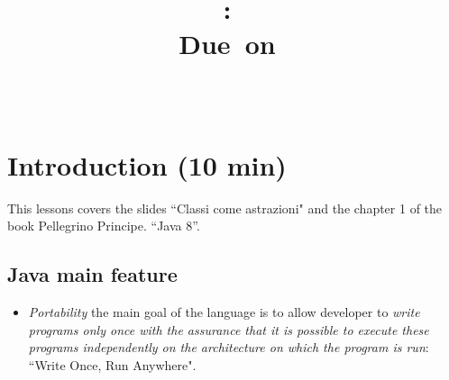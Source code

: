 \documentclass{article}
\title{
\vspace{2in}
\textmd{\textbf{\hmwkClass:\ \hmwkTitle}}\\
\normalsize\vspace{0.1in}\small{Due\ on\ \hmwkDueDate}\\
\vspace{0.1in}\large{\textit{\hmwkClassInstructor\ \hmwkClassTime}}
\vspace{3in}
}
\author{\textbf{\hmwkAuthorName}}
\date{} %
\theoremstyle{definition}
\begin{document}
\maketitle



\newpage
\tableofcontents
\newpage



\section{Introduction (10 min)}
This lessons covers the slides ``Classi come astrazioni" and the chapter 1 of the book  Pellegrino Principe. “Java 8”.
\subsection{Java main feature}
\begin{itemize}
\item \emph{Portability} the main goal of the language is to allow developer to \emph{write programs only once with the assurance that it is possible to execute these programs independently on the architecture on which the program is run}: ``Write Once, Run Anywhere".
\end{itemize}
\end{document}
